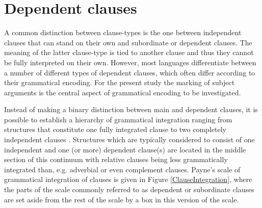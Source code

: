 \section{Dependent clauses}\label{DepCl}

A common distinction between clause-types is the one between independent clauses that can stand on their own and subordinate or dependent clauses. 
The meaning of the latter clause-type is tied to another clause and thus they cannot be fully interpreted on their own.  
However, most languages differentiate between a number of different types of dependent clauses, which often differ according to their grammatical encoding.
For the present study the marking of subject arguments is the central aspect of grammatical encoding to be investigated.

Instead of making a binary distinction between main and dependent clauses, it is possible to establish a hierarchy of grammatical integration ranging from structures that constitute one fully integrated clause to two completely independent clauses \citep[307]{Payne:1997}. 
Structures which are typically considered to consist of one independent and one (or more) dependent clause(s) are located in the middle section of this continuum with relative clauses being less grammatically integrated than, e.g. adverbial or even complement clauses. 
Payne's scale of grammatical integration of clauses is given in Figure \ref{ClauseIntegration}, where the parts of the scale commonly referred to as dependent or subordinate clauses are set aside from the rest of the scale by a box in this version of the scale.
 
